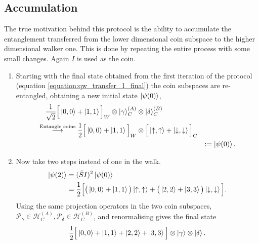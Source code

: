 \subsection{Accumulation}
\label{subsection:qw_accumulation}
The true motivation behind this protocol is the ability to accumulate the entanglement transferred from the lower dimensional coin subspace to the higher dimensional walker one.
This is done by repeating the entire process with some small changes.
Again $I$ is used as the coin.
\begin{enumerate}

    \item Starting with the final state obtained from the first iteration of the protocol (equation \ref{equation:qw_transfer_1_final}) the coin subspaces are re-entangled, obtaining a new initial state $\ket{\psi(0)}$,
    \begin{alignat}{3}
        \frac{1}{\sqrt{2}}
        \Big [\ket{0, 0} + \ket{1, 1}\Big ]_W\otimes \ket{\gamma}^{(A)}_C &\otimes \ket{\delta}^{(B)}_C\\
        \overset{\text{Entangle coins}}{\longrightarrow}
        \frac{1}{2}\Big [\ket{0, 0} + \ket{1, 1}\Big ]_W &\otimes
        \Big [\ket{\uparrow, \uparrow} + \ket{\downarrow, \downarrow}\Big ]_C& \\
        & &:=\ket{\psi(0)}.
    \end{alignat}
    \item Now take two steps instead of one in the walk.
    \begin{align}
        \ket{\psi(2)} &= (\tilde{S}I)^2\ket{\psi(0)}\\
        &= \frac{1}{2}\Big[\big (\ket{0,0}+\ket{1,1}\big )\ket{\uparrow,\uparrow} + \big (\ket{2,2} + \ket{3,3}\big )\ket{\downarrow,\downarrow}\Big ].
    \end{align}
     Using the same projection operators in the two coin subspaces, $\mathcal{P}_\gamma \in \mathcal{H}^{(A)}_C,  \mathcal{P}_\delta \in \mathcal{H}^{(B)}_C$, and renormalising gives the final state
    \begin{equation}
        \frac{1}{2}\Big[\ket{0,0} + \ket{1,1} + \ket{2,2} + \ket{3,3}\Big ] \otimes \ket{\gamma}\otimes\ket{\delta}.
    \end{equation}
\end{enumerate}

